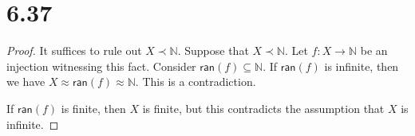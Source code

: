 \documentclass[a4paper]{article}
\newcommand{\ran}{\mathsf{ran}}
\newcommand{\N}{\mathbb{N}}
\begin{document}
\section*{6.37}
\begin{proof}
  It suffices to rule out $X \prec \N$.
  Suppose that $X \prec \N$.
  Let $f\colon X \to \N$ be an injection witnessing this fact.
  Consider $\ran(f) \subseteq \N$.
  If $\ran(f)$ is infinite, then we have $X \approx \ran(f) \approx \N$.
  This is a contradiction.

  If $\ran(f)$ is finite, then $X$ is finite, but this contradicts the assumption that $X$ is infinite.
\end{proof}

\end{document}
